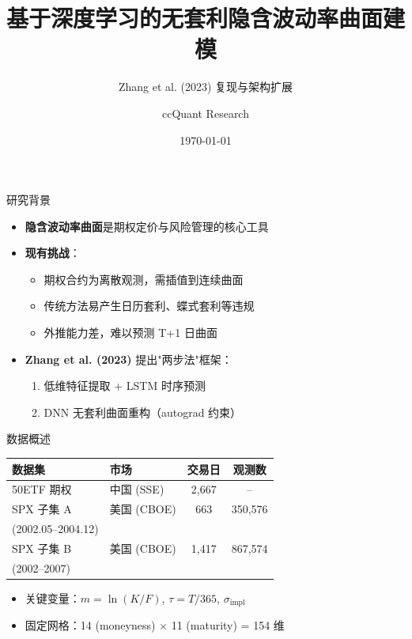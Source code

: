 \documentclass[aspectratio=169]{beamer}
\title{基于深度学习的无套利隐含波动率曲面建模}
\subtitle{Zhang et al. (2023) 复现与架构扩展}
\author{ccQuant Research}
\date{\today}
\begin{document}
\begin{frame}
\titlepage
\end{frame}

\begin{frame}{研究背景}
\begin{itemize}
    \item \textbf{隐含波动率曲面}是期权定价与风险管理的核心工具
    \item \textbf{现有挑战}：
    \begin{itemize}
        \item 期权合约为离散观测，需插值到连续曲面
        \item 传统方法易产生日历套利、蝶式套利等违规
        \item 外推能力差，难以预测 T+1 日曲面
    \end{itemize}
    \item \textbf{Zhang et al. (2023)} 提出"两步法"框架：
    \begin{enumerate}
        \item 低维特征提取 + LSTM 时序预测
        \item DNN 无套利曲面重构（autograd 约束）
    \end{enumerate}
\end{itemize}
\end{frame}

\begin{frame}{数据概述}
\begin{table}
\centering
\begin{tabular}{@{}llcc@{}}
\toprule
\textbf{数据集} & \textbf{市场} & \textbf{交易日} & \textbf{观测数} \\
\midrule
50ETF 期权 & 中国 (SSE) & 2,667 & -- \\
\midrule
SPX 子集 A & 美国 (CBOE) & 663 & 350,576 \\
(2002.05--2004.12) & & & \\
\midrule
SPX 子集 B & 美国 (CBOE) & 1,417 & 867,574 \\
(2002--2007) & & & \\
\bottomrule
\end{tabular}
\end{table}

\vspace{0.3cm}
\begin{itemize}
    \item 关键变量：$m = \ln(K/F)$, $\tau = T/365$, $\sigma_{\text{impl}}$
    \item 固定网格：14 (moneyness) $\times$ 11 (maturity) = 154 维
\end{itemize}
\end{frame}
\end{document}
